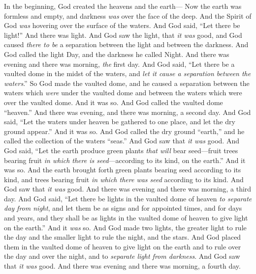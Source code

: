 
\begin{biblechapter} %
 In the beginning, God created the heavens and the earth—
\verse Now the earth was formless and empty, and darkness \textit{was} over the face of the deep. And the Spirit of God \textit{was} hovering over the surface of the waters.
\verse And God said, “Let there be light!” And there was light.
\verse And God saw the light, that \textit{it was} good, and God caused \textit{there to be} a separation between the light and between the darkness.
\verse And God called the light Day, and the darkness he called Night. And there was evening and there was morning, \textit{the} first day.
\verse And God said, “Let there be a vaulted dome in the midst of the waters, and \textit{let it cause a separation between the waters}.”
\verse So God made the vaulted dome, and he caused a separation between the waters which \textit{were} under the vaulted dome and between the waters which were over the vaulted dome. And it was so.
\verse And God called the vaulted dome “heaven.” And there was evening, and there was morning, a second day.
\verse And God said, “Let the waters under heaven be gathered to one place, and let the dry ground appear.” And it was so.
\verse And God called the dry ground “earth,” and he called the collection of the waters “seas.” And God saw that \textit{it was} good.
\verse And God said, “Let the earth produce green plants \textit{that will} bear seed—fruit trees bearing fruit \textit{in which there is seed}—according to its kind, on the earth.” And it was so.
\verse And the earth brought forth green plants bearing seed according to its kind, and trees bearing fruit \textit{in which there was seed} according to its kind. And God saw that \textit{it was} good.
\verse And there was evening and there was morning, a third day.
\verse And God said, “Let there be lights in the vaulted dome of heaven \textit{to separate day from night}, and let them be as signs and for appointed times, and for days and years,
\verse and they shall be as lights in the vaulted dome of heaven to give light on the earth.” And it \textit{was} so.
\verse And God made two lights, the greater light to rule the day and the smaller light to rule the night, and the stars.
\verse And God placed them in the vaulted dome of heaven to give light on the earth
\verse and to rule over the day and over the night, and to \textit{separate light from darkness}. And God saw that \textit{it was} good.
\verse And there was evening and there was morning, a fourth day.

\end{biblechapter}
